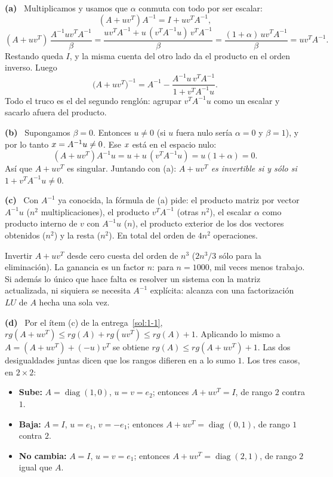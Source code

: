 \documentclass[11pt,a4paper]{article}
\newcommand{\bi}[1]{\boldsymbol{#1}}
\newcommand{\n}[1]{\boldsymbol{#1}}
\newcommand{\bu}{\bi{u}}  \newcommand{\bv}{\bi{v}}  \newcommand{\bw}{\bi{w}}
\DeclareMathOperator{\gen}{span}
\DeclareMathOperator{\tr}{tr}
\DeclareMathOperator{\rg}{rg}
\DeclareMathOperator{\diag}{diag}
\def\n#1{#1}\def\bi#1{#1}\def\rg{rg}\def\tr{tr}\def\gen{span}%
\newcounter{entrega}[section]
\newcommand{\itemsol}[1]{\par\medskip\noindent\textbf{(#1)}\ \ignorespaces}
\begin{document}
\itemsol{a} Multiplicamos y usamos que $\alpha$ conmuta con todo por ser
escalar:
\[
(A+\bu\bv^T)A^{-1}=I+\bu\bv^TA^{-1},
\]
\[
(A+\bu\bv^T)\,\frac{A^{-1}\bu\bv^TA^{-1}}{\beta}
=\frac{\bu\bv^TA^{-1}+\bu\,(\bv^TA^{-1}\bu)\,\bv^TA^{-1}}{\beta}
=\frac{(1+\alpha)\,\bu\bv^TA^{-1}}{\beta}=\bu\bv^TA^{-1}.
\]
Restando queda $I$, y la misma cuenta del otro lado da el producto en el orden
inverso. Luego
\[
\big(A+\bu\bv^T\big)^{-1}=A^{-1}-\frac{A^{-1}\bu\,\bv^TA^{-1}}{1+\bv^TA^{-1}\bu}.
\]
Todo el truco es el del segundo renglón: agrupar $\bv^TA^{-1}\bu$ como un
escalar y sacarlo afuera del producto.

\itemsol{b} Supongamos $\beta=0$. Entonces $\bu\neq\n0$ (si $\bu$ fuera nulo
sería $\alpha=0$ y $\beta=1$), y por lo tanto $\bx=A^{-1}\bu\neq\n0$. Ese $\bx$
está en el espacio nulo:
\[
(A+\bu\bv^T)A^{-1}\bu=\bu+\bu\,(\bv^TA^{-1}\bu)=\bu(1+\alpha)=\n0 .
\]
Así que $A+\bu\bv^T$ es singular. Juntando con (a): \emph{$A+\bu\bv^T$ es
invertible si y sólo si $1+\bv^TA^{-1}\bu\neq0$}.

\itemsol{c} Con $A^{-1}$ ya conocida, la fórmula de (a) pide: el producto matriz
por vector $A^{-1}\bu$ ($n^2$ multiplicaciones), el producto $\bv^TA^{-1}$
(otras $n^2$), el escalar $\alpha$ como producto interno de $\bv$ con
$A^{-1}\bu$ ($n$), el producto exterior de los dos vectores obtenidos ($n^2$) y
la resta ($n^2$). En total del orden de $4n^2$ operaciones.

Invertir $A+\bu\bv^T$ desde cero cuesta del orden de $n^3$ ($2n^3/3$ sólo para
la eliminación). La ganancia es un factor $n$: para $n=1000$, mil veces menos
trabajo. Si además lo único que hace falta es resolver un sistema con la matriz
actualizada, ni siquiera se necesita $A^{-1}$ explícita: alcanza con una
factorización $LU$ de $A$ hecha una sola vez.

\itemsol{d} Por el ítem (c) de la entrega~\ref{sol:1-1},
$\rg(A+\bu\bv^T)\le\rg(A)+\rg(\bu\bv^T)\le\rg(A)+1$. Aplicando lo mismo a
$A=(A+\bu\bv^T)+(-\bu)\bv^T$ se obtiene $\rg(A)\le\rg(A+\bu\bv^T)+1$. Las dos
desigualdades juntas dicen que los rangos difieren en a lo sumo $1$. Los tres
casos, en $2\times2$:
\begin{itemize}[itemsep=2pt,topsep=3pt]
\item \textbf{Sube:} $A=\diag(1,0)$, $\bu=\bv=\bi{e}_2$; entonces $A+\bu\bv^T=I$,
de rango $2$ contra $1$.
\item \textbf{Baja:} $A=I$, $\bu=\bi{e}_1$, $\bv=-\bi{e}_1$; entonces
$A+\bu\bv^T=\diag(0,1)$, de rango $1$ contra $2$.
\item \textbf{No cambia:} $A=I$, $\bu=\bv=\bi{e}_1$; entonces
$A+\bu\bv^T=\diag(2,1)$, de rango $2$ igual que $A$.
\end{itemize}
\end{document}
